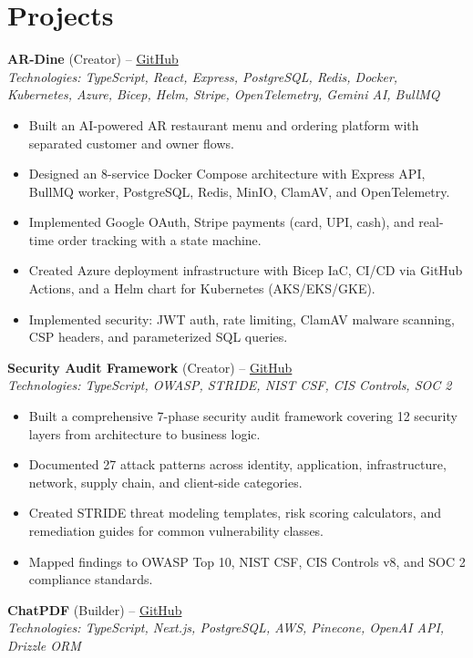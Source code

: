 \documentclass[11pt,a4paper]{article}
\begin{document}
\section{Projects}
\textbf{AR-Dine} (Creator) -- \href{https://github.com/Arihant1208/ARDine}{GitHub}
\\ \textit{Technologies: TypeScript, React, Express, PostgreSQL, Redis, Docker, Kubernetes, Azure, Bicep, Helm, Stripe, OpenTelemetry, Gemini AI, BullMQ}
\begin{itemize}
  \item Built an AI-powered AR restaurant menu and ordering platform with separated customer and owner flows.
  \item Designed an 8-service Docker Compose architecture with Express API, BullMQ worker, PostgreSQL, Redis, MinIO, ClamAV, and OpenTelemetry.
  \item Implemented Google OAuth, Stripe payments (card, UPI, cash), and real-time order tracking with a state machine.
  \item Created Azure deployment infrastructure with Bicep IaC, CI/CD via GitHub Actions, and a Helm chart for Kubernetes (AKS/EKS/GKE).
  \item Implemented security: JWT auth, rate limiting, ClamAV malware scanning, CSP headers, and parameterized SQL queries.
\end{itemize}
\vspace{2pt}
\textbf{Security Audit Framework} (Creator) -- \href{https://github.com/Arihant1208/security-audit-monorepo}{GitHub}
\\ \textit{Technologies: TypeScript, OWASP, STRIDE, NIST CSF, CIS Controls, SOC 2}
\begin{itemize}
  \item Built a comprehensive 7-phase security audit framework covering 12 security layers from architecture to business logic.
  \item Documented 27 attack patterns across identity, application, infrastructure, network, supply chain, and client-side categories.
  \item Created STRIDE threat modeling templates, risk scoring calculators, and remediation guides for common vulnerability classes.
  \item Mapped findings to OWASP Top 10, NIST CSF, CIS Controls v8, and SOC 2 compliance standards.
\end{itemize}
\vspace{2pt}
\textbf{ChatPDF} (Builder) -- \href{https://github.com/Arihant1208/ChatPdf}{GitHub}
\\ \textit{Technologies: TypeScript, Next.js, PostgreSQL, AWS, Pinecone, OpenAI API, Drizzle ORM}
\end{document}
